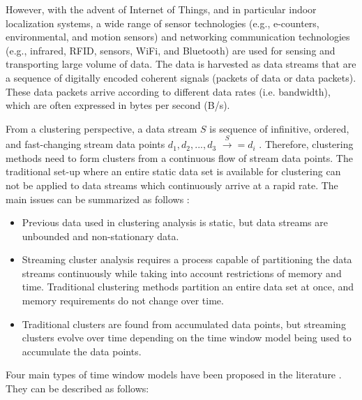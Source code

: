 However, with the advent of Internet of Things, and in particular indoor localization systems, a wide range of sensor technologies (e.g., e-counters, environmental, and motion sensors) and networking communication technologies (e.g., infrared, RFID, sensors, WiFi, and Bluetooth) are used for sensing and transporting large volume of data. The data is harvested as data streams that are a sequence of digitally encoded coherent signals (packets of data or data packets). These data packets arrive according to different data rates (i.e. bandwidth), which are often expressed in bytes per second (B/s).

From a clustering perspective, a data stream $S$ is sequence of infinitive, ordered, and fast-changing stream data points $d_1, d_2, ..., d_3 $ $\xrightarrow S = {d_i}$ \cite{han2011data}. Therefore, clustering methods need to form clusters from a continuous flow of stream data points. The traditional set-up where an entire static data set is available for clustering can not be applied to data streams which continuously arrive at a rapid rate. The main issues can be summarized as follows \cite{toshniwal2013clustering}:

\begin{itemize}
    \item Previous data used in clustering analysis is static, but data streams are unbounded and non-stationary data.
    \item Streaming cluster analysis requires a process capable of partitioning the data streams continuously while taking into account restrictions of memory and time. Traditional clustering methods partition an entire data set at once, and memory requirements do not change over time. 
    \item Traditional clusters are found from accumulated data points, but streaming clusters evolve over time depending on the time window model being used to accumulate the data points.
\end{itemize}

Four main types of time window models have been proposed in the literature \cite{nguyen2015survey, mansalis2018evaluation}. They can be described as follows:

